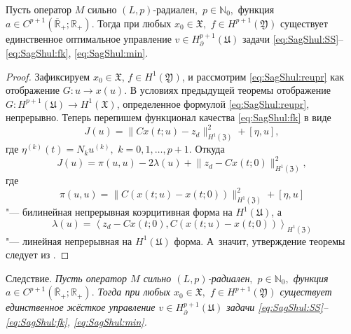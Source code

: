 

\begin{theorem}[4]Пусть  оператор $M$ сильно $(L,p)$-радиален$,$ $p\in{\mathbb N}_0,$ функция  $a\in C^{p+1}(\overline{\mathbb R} _+;{\mathbb R}_+).$
Тогда при любых $x_0\in{\mathfrak X},$ $f\in H^{p+1}({\mathfrak Y})$ существует единственное оптимальное управление
 $v\in H_{\partial}^{p+1}({\mathfrak U})$ задачи \rm \eqref{eq:SagShul:SS}--\eqref{eq:SagShul:fk}, \eqref{eq:SagShul:min}.
\end{theorem}

\smallskip

\begin{proof}
Зафиксируем $x_0\in\mathfrak X$, $f\in H^1({\mathfrak Y})$, и рассмотрим \eqref{eq:SagShul:reupr} как отображение $G:u\to x(u)$. В условиях предыдущей теоремы отображение  $G:H^{p+1}({\mathfrak U})\to H^1({\mathfrak X})$, определенное формулой \eqref{eq:SagShul:reupr}, непрерывно.
Теперь перепишем функционал качества \eqref{eq:SagShul:fk} в виде
$$
J(u)=\bigl\|Cx(t;u)-z_d\bigr \|^2_{H^1({\mathfrak Z})}+[\eta,u],
$$
где $\eta^{(k)}(t)=N_ku^{(k)},$ $k=0, 1, \ldots,p+1$. Откуда
$$
J(u)=\pi(u,u)-2\lambda(u)+ \bigl \|z_d-Cx(t;0)\bigr \|^2_{H^1({\mathfrak Z})},
$$
где $$\pi(u,u)= \bigl \|C(x(t;u)-x(t;0)) \bigr \|^2_{H^1({\mathfrak Z})}+[\eta,u]$$ "---
билинейная непрерывная коэрцитивная форма на $H^{1}({\mathfrak U})$, а
$$
\lambda(u)=\left\langle
z_d-Cx(t;0), C(x(t;u)-x(t;0))
\right\rangle_{H^1({\mathfrak Z})}
$$ "---
линейная непрерывная на $H^{1}({\mathfrak U})$ форма. А~значит, утверждение теоремы следует из  \cite[гл.~1]{SagShul:bib:Lions}.
\end{proof}

\smallskip

{\small\sc Следствие.} {\it
Пусть  оператор $M$ сильно $(L,p)$-радиален$,$ $p\in{\mathbb N}_0,$ функция  $a\in C^{p+1}(\overline{\mathbb R} _+;{\mathbb R}_+).$
Тогда при любых $x_0\in{\mathfrak X},$ $f\in H^{p+1}({\mathfrak Y})$ существует единственное жёсткое управление
 $v\in H_{\partial}^{p+1}({\mathfrak U})$ задачи \rm \eqref{eq:SagShul:SS}--\eqref{eq:SagShul:fk}, \eqref{eq:SagShul:min}.
}





